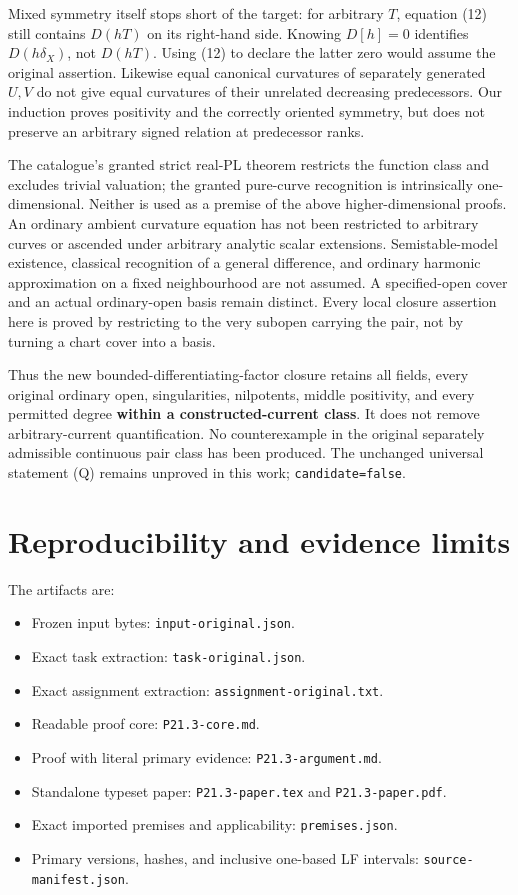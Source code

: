 \documentclass[
  11pt,
]{article}
\providecommand{\tightlist}{%
  \setlength{\itemsep}{0pt}\setlength{\parskip}{0pt}}
\begin{document}
Mixed symmetry itself stops short of the target: for arbitrary \(T\),
equation (12) still contains \(D(hT)\) on its right-hand side. Knowing
\(D[h]=0\) identifies \(D(h\delta_X)\), not \(D(hT)\). Using (12) to
declare the latter zero would assume the original assertion. Likewise
equal canonical curvatures of separately generated \(U,V\) do not give
equal curvatures of their unrelated decreasing predecessors. Our
induction proves positivity and the correctly oriented symmetry, but
does not preserve an arbitrary signed relation at predecessor ranks.

The catalogue's granted strict real-PL theorem restricts the function
class and excludes trivial valuation; the granted pure-curve recognition
is intrinsically one-dimensional. Neither is used as a premise of the
above higher-dimensional proofs. An ordinary ambient curvature equation
has not been restricted to arbitrary curves or ascended under arbitrary
analytic scalar extensions. Semistable-model existence, classical
recognition of a general difference, and ordinary harmonic approximation
on a fixed neighbourhood are not assumed. A specified-open cover and an
actual ordinary-open basis remain distinct. Every local closure
assertion here is proved by restricting to the very subopen carrying the
pair, not by turning a chart cover into a basis.

Thus the new bounded-differentiating-factor closure retains all fields,
every original ordinary open, singularities, nilpotents, middle
positivity, and every permitted degree \textbf{within a
constructed-current class}. It does not remove arbitrary-current
quantification. No counterexample in the original separately admissible
continuous pair class has been produced. The unchanged universal
statement (Q) remains unproved in this work; \texttt{candidate=false}.

\section{Reproducibility and evidence
limits}\label{reproducibility-and-evidence-limits}

The artifacts are:

\begin{itemize}
\tightlist
\item
  Frozen input bytes: \texttt{input-original.json}.
\item
  Exact task extraction: \texttt{task-original.json}.
\item
  Exact assignment extraction: \texttt{assignment-original.txt}.
\item
  Readable proof core: \texttt{P21.3-core.md}.
\item
  Proof with literal primary evidence: \texttt{P21.3-argument.md}.
\item
  Standalone typeset paper: \texttt{P21.3-paper.tex} and
  \texttt{P21.3-paper.pdf}.
\item
  Exact imported premises and applicability: \texttt{premises.json}.
\item
  Primary versions, hashes, and inclusive one-based LF intervals:
  \texttt{source-manifest.json}.
\end{itemize}
\end{document}
